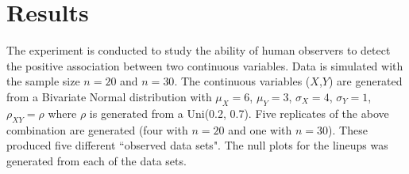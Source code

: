\documentclass[12]{report}
\begin{document}


\section{Results}\label{results}
The experiment is conducted to study the ability of human observers to detect the positive association between two continuous variables. Data is simulated with the sample size $n = 20$ and $n=30$. The continuous variables ($X$,$Y$) are generated from a Bivariate Normal distribution with $\mu_X = 6$, $\mu_Y = 3$, $\sigma_X = 4$, $\sigma_Y = 1$, $\rho_{XY} = \rho$ where $\rho$ is generated from a Uni(0.2, 0.7). Five replicates of the above combination are generated (four with $n =20$ and one with $n=30$). These produced five different ``observed data sets". The null plots for the lineups was generated from each of the data sets. \\
\end{document}
